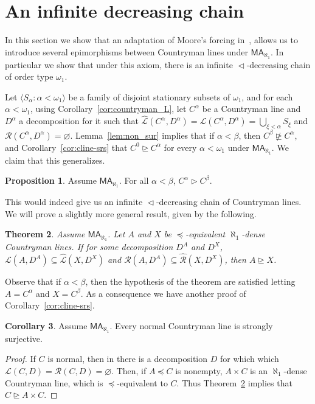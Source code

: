 \documentclass[10pt]{amsart}
\newtheorem{theorem}{Theorem}[section]
\theoremstyle{definition}
\newtheorem{corollary}[theorem]{Corollary}
\newtheorem{proposition}[theorem]{Proposition}
\theoremstyle{remark}
\newcommand{\es}{\varnothing}
\newcommand{\seb}{\subseteq}
\newcommand{\tup}[1]{\langle#1\rangle}
\newcommand{\axiom}[1]{\mathsf{#1}}
\newcommand{\MA}{\axiom{MA}}
\newcommand{\eleq}{\preceq}
\newcommand{\sle}{\vartriangleleft}
\newcommand{\sge}{\vartriangleright}
\newcommand{\sgeq}{\trianglerighteq}
\newcommand{\nsgeq}{\ntrianglerighteq}
\renewcommand{\L}{\mathscr{L}}
\newcommand{\R}{\mathscr{R}}
\newcommand{\La}{\hat{\L}}
\newcommand{\Ra}{\hat{\R}}
\newcommand{\1}{\mathbbm{1}}
\begin{document}
\section{An infinite decreasing chain}\label{sec:infinite-chain}

In this section we show that an adaptation of Moore's forcing
in~\cite{Moore2009}, allows us to introduce several epimorphisms
between Countryman lines under $\MA_{\aleph_{1}}$. In particular we
show that under this axiom, there is an infinite $\sle$-decreasing
chain of order type $\omega_{1}$.

Let $\tup{S_{\alpha} : \alpha < \omega_{1}}$ be a family of disjoint
stationary subsets of $\omega_{1}$, and for each $\alpha < \omega_{1}$,
using Corollary~\ref{cor:countryman_L}, let $C^{\alpha}$ be a Countryman
line and $D^{\alpha}$ a decomposition for it such that
$\La(C^{\alpha},D^{\alpha}) = \L(C^{\alpha},D^{\alpha}) = \bigcup_{\xi < \alpha}S_{\xi}$
and $\R(C^{\alpha},D^{\alpha}) = \es$. Lemma~\ref{lem:non_sur} implies that
if $\alpha < \beta$, then $C^{\beta} \nsgeq C^{\alpha}$,
and Corollary~\ref{cor:cline-srs} that $C^{0} \sgeq C^{\alpha}$ for every $\alpha < \omega_{1}$
under $\MA_{\aleph_{1}}$. We claim that this generalizes.

\begin{proposition}
  Assume $\MA_{\aleph_{1}}$. For all $\alpha < \beta$,
  $C^{\alpha} \sge C^{\beta}$.
\end{proposition}

This would indeed give us an infinite $\sle$-decreasing chain of Countryman lines.
We will prove a slightly more general result, given by the following.

\begin{theorem}\label{thm:ma-epi}
  Assume $\MA_{\aleph_{1}}$. Let $A$ and $X$ be $\eleq$-equivalent
  $\aleph_{1}$-dense Countryman lines. If
  for some decomposition $D^{A}$ and $D^{X}$, $\L(A,D^{A}) \seb \La(X,D^X)$ and
  $\R(A,D^{A}) \seb \Ra(X,D^{X})$, then $A \sgeq X$.
\end{theorem}

Observe that if $\alpha < \beta$, then the hypothesis
of the theorem are satisfied letting $A = C^{\alpha}$ and $X = C^{\beta}$. As
a consequence we have another proof of Corollary~\ref{cor:cline-srs}.

\begin{corollary}\label{cor:c-srs2}
  Assume $\MA_{\aleph_{1}}$. Every normal Countryman line is strongly surjective.
\end{corollary}
\begin{proof}
  If $C$ is normal, then in there is a decomposition $D$ for which
  which $\L(C,D) = \R(C,D) = \es$. Then, if $A \eleq C$ is nonempty,
  $A \times C$ is an $\aleph_{1}$-dense Countryman line,
  which is $\eleq$-equivalent to $C$. Thus
 Theorem~\ref{thm:ma-epi} implies that $C \sgeq A \times C$.
\end{proof}
\end{document}
